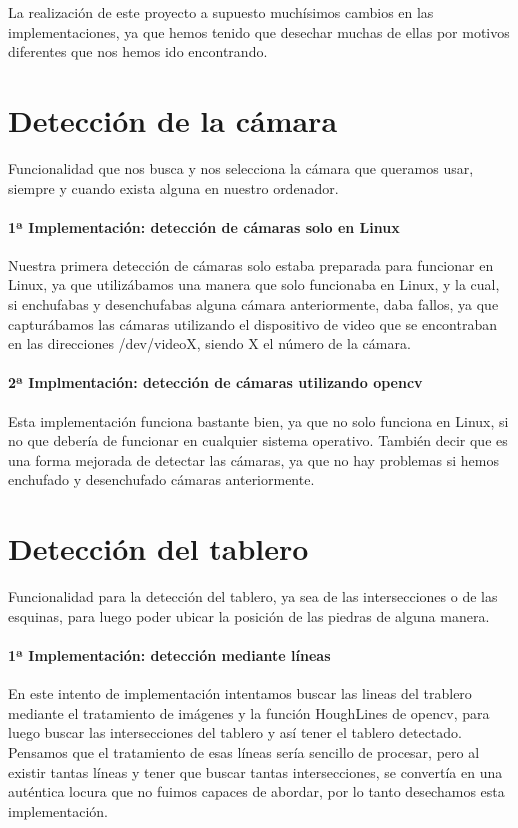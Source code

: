\documentclass[12pt,a4paper]{report}
\begin{document}
La realización de este proyecto a supuesto muchísimos cambios en las
implementaciones, ya que hemos tenido que desechar muchas de ellas por motivos
diferentes que nos hemos ido encontrando. 


\section{Detección de la cámara} 
Funcionalidad que nos busca y nos selecciona la cámara que queramos usar,
siempre y cuando exista alguna en nuestro ordenador. 

\paragraph{1ª Implementación: detección de cámaras solo en Linux}

Nuestra primera detección de cámaras solo estaba preparada para funcionar en
Linux, ya que utilizábamos una manera que solo funcionaba en Linux, y la cual,
si enchufabas y desenchufabas alguna cámara anteriormente, daba fallos, ya que
capturábamos las cámaras utilizando el dispositivo de video que se encontraban
en las direcciones /dev/videoX, siendo X el número de la cámara. 

\paragraph{2ª Implmentación: detección de cámaras utilizando opencv}

Esta implementación funciona bastante bien, ya que no solo funciona en Linux, 
si no que debería de funcionar en cualquier sistema operativo. También decir que
es una forma mejorada de detectar las cámaras, ya que no hay problemas si hemos
enchufado y desenchufado cámaras anteriormente. 


\section{Detección del tablero} 
Funcionalidad para la detección del tablero, ya sea de las intersecciones o de
las esquinas, para luego poder ubicar la posición de las piedras de alguna
manera. 

\paragraph{1ª Implementación: detección mediante líneas}
En este intento de implementación intentamos buscar las lineas del trablero 
mediante el tratamiento de imágenes y la función HoughLines de opencv, para 
luego buscar las intersecciones del tablero y así tener el tablero detectado. 
Pensamos que el tratamiento de esas líneas sería sencillo de procesar, pero al
existir tantas líneas y tener que buscar tantas intersecciones, se convertía en
una auténtica locura que no fuimos capaces de abordar, por lo tanto desechamos
esta implementación. 
\end{document}
